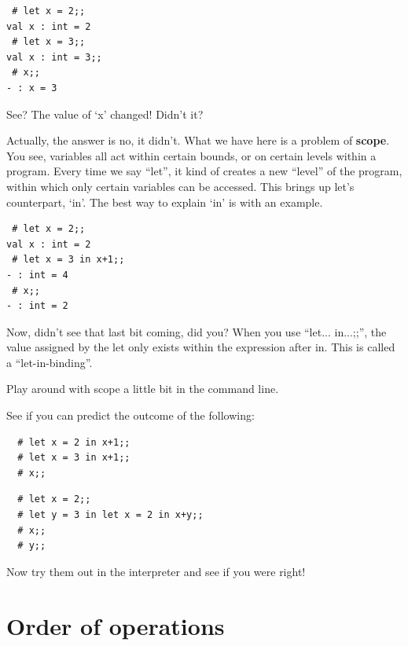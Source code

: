 \documentclass[10pt]{book}
\begin{document}

\beforeverb
\begin{verbatim}
 # let x = 2;;
val x : int = 2
 # let x = 3;;
val x : int = 3;;
 # x;;
- : x = 3
\end{verbatim}
\afterverb

See? The value of `x' changed! Didn't it?

Actually, the answer is no, it didn't. What we have here is a problem of {\bf scope}. You see, variables
all act within certain bounds, or on certain levels within a program. Every time we say ``let'', it kind of
creates a new ``level'' of the program, within which only certain variables can be accessed. This brings up
let's counterpart, `in'. The best way to explain `in' is with an example.

\beforeverb
\begin{verbatim}
 # let x = 2;;
val x : int = 2
 # let x = 3 in x+1;;
- : int = 4
 # x;;
- : int = 2
\end{verbatim}
\afterverb

Now, didn't see that last bit coming, did you? When you use ``let... in...;;'', the value assigned by the let only
exists within the expression after in. This is called a ``let-in-binding''.


\begin{ex}
 Play around with scope a little bit in the command line.

 See if you can predict the outcome of the following:
 
\begin{list}{}{}
  \item
 \beforeverb
 \begin{verbatim}
  # let x = 2 in x+1;;
  # let x = 3 in x+1;;
  # x;;
 \end{verbatim}
 \afterverb
   \item 
 \beforeverb
 \begin{verbatim}
  # let x = 2;;
  # let y = 3 in let x = 2 in x+y;;
  # x;;
  # y;;
 \end{verbatim}
 \afterverb
\end{list}

Now try them out in the interpreter and see if you were right!
\end{ex}


\section{Order of operations}
\end{document}
